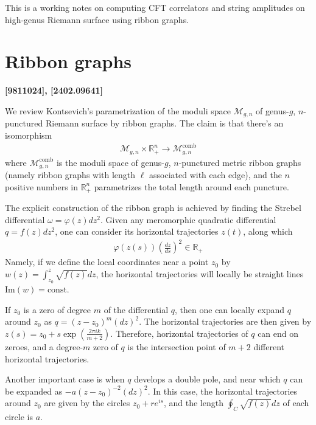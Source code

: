 \documentclass[12pt,letterpaper]{article}
\def\ie{\begin{equation}\begin{aligned}}
\def\fe{\end{aligned}\end{equation}}
\numberwithin{equation}{section}
\begin{document}
This is a working notes on computing CFT correlators and string amplitudes on high-genus Riemann surface using ribbon graphs.

\section{Ribbon graphs}

\textbf{[9811024], [2402.09641]}

We review Kontsevich's parametrization of the moduli space $\mathcal{M}_{g,n}$ of genus-$g$, $n$-punctured Riemann surface by ribbon graphs. The claim is that there's an isomorphism
\ie
\mathcal{M}_{g,n}\times \mathbb{R}_+^n\rightarrow \mathcal{M}_{g,n}^{\text{comb}}
\fe
where $\mathcal{M}_{g,n}^{\text{comb}}$ is the moduli space of genus-$g$, $n$-punctured metric ribbon graphs (namely ribbon graphs with length $\ell$ associated with each edge), and the $n$ positive numbers in $\mathbb{R}_+^n$ parametrizes the total length around each puncture.

The explicit construction of the ribbon graph is achieved by finding the Strebel differential $\omega = \varphi(z) dz^2$. Given any meromorphic quadratic differential $q=f(z)dz^2$, one can consider its horizontal trajectories $z(t)$, along which
\ie
\varphi(z(s))\left(\frac{dz}{ds}\right)^2\in \mathbb{R}_+
\fe
Namely, if we define the local coordinates near a point $z_0$ by $w(z)=\int_{z_0}^z \sqrt{f(z)}dz$, the horizontal trajectories will locally be straight lines $\mathrm{Im}(w)=\text{const}$. 

If $z_0$ is a zero of degree $m$ of the differential $q$, then one can locally expand $q$ around $z_0$ as $q=(z-z_0)^m (dz)^2$. The horizontal trajectories are then given by $z(s)= z_0+s\exp(\frac{2\pi i k}{m+2})$. Therefore, horizontal trajectories of $q$ can end on zeroes, and a degree-$m$ zero of $q$ is the intersection point of $m+2$ different horizontal trajectories.

Another important case is when $q$ develops a double pole, and near which $q$ can be expanded as $-a(z-z_0)^{-2}(dz)^2$. In this case, the horizontal trajectories around $z_0$ are given by the circles $z_0+re^{is}$, and the length $\oint_C \sqrt{f(z)}dz$ of each circle is $a$. 
\end{document}
